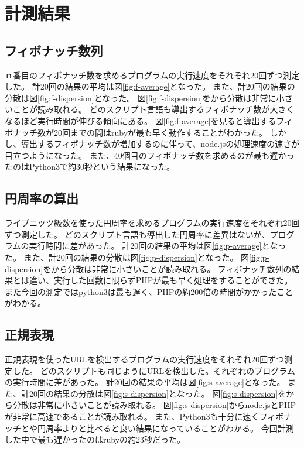 \chapter{計測結果}
\label{cha:result}
\section{フィボナッチ数列}
ｎ番目のフィボナッチ数を求めるプログラムの実行速度をそれぞれ20回ずつ測定した。
計20回の結果の平均は図\ref{fig:f-average}となった。
また、計20回の結果の分散は図\ref{fig:f-dispersion}となった。
図\ref{fig:f-dispersion}をから分散は非常に小さいことが読み取れる。
どのスクリプト言語も導出するフィボナッチ数が大きくなるほど実行時間が伸びる傾向にある。
図\ref{fig:f-average}を見ると導出するフィボナッチ数が20回までの間はrubyが最も早く動作することがわかった。
しかし、導出するフィボナッチ数が増加するのに伴って、node.jsの処理速度の速さが目立つようになった。
また、40個目のフィボナッチ数を求めるのが最も遅かったのはPython3で約30秒という結果になった。

\section{円周率の算出}
ライプニッツ級数を使った円周率を求めるプログラムの実行速度をそれぞれ20回ずつ測定した。
どのスクリプト言語も導出した円周率に差異はないが、プログラムの実行時間に差があった。
計20回の結果の平均は図\ref{fig:p-average}となった。
また、計20回の結果の分散は図\ref{fig:p-dispersion}となった。
図\ref{fig:p-dispersion}をから分散は非常に小さいことが読み取れる。
フィボナッチ数列の結果とは違い、実行した回数に限らずPHPが最も早く処理をすることができた。
また今回の測定ではpython3は最も遅く、PHPの約200倍の時間がかかったことがわかる。

\section{正規表現}
正規表現を使ったURLを検出するプログラムの実行速度をそれぞれ20回ずつ測定した。
どのスクリプトも同じようにURLを検出した。それぞれのプログラムの実行時間に差があった。
計20回の結果の平均は図\ref{fig:s-average}となった。
また、計20回の結果の分散は図\ref{fig:s-dispersion}となった。
図\ref{fig:s-dispersion}をから分散は非常に小さいことが読み取れる。
図\ref{fig:s-dispersion}からnode.jsとPHPが非常に高速であることが読み取れる。
また、Python3も十分に速くフィボナッチとや円周率よりと比べると良い結果になっていることがわかる。
今回計測した中で最も遅かったのはrubyの約23秒だった。


